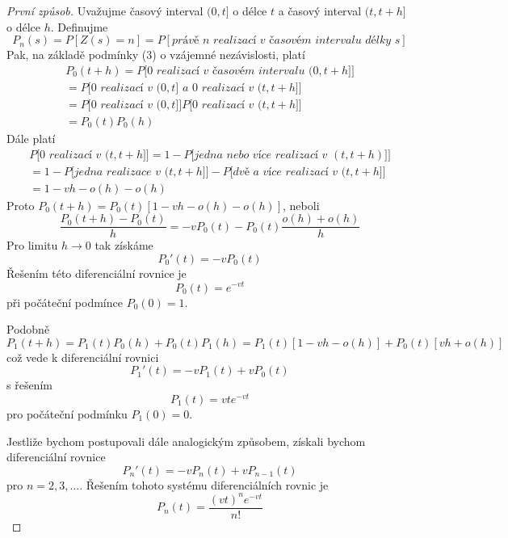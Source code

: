 \begin{proof}[První způsob]
Uvažujme časový interval $(0, t]$ o délce $t$ a časový interval $(t, t + h]$ o délce $h$. Definujme
\begin{equation*}
P_n(s) = P[Z(s) = n] = P[\textit{právě } n \textit{ realizací v časovém intervalu délky } s]
\end{equation*}
Pak, na základě podmínky (3) o vzájemné nezávislosti, platí
\begin{gather*}
P_0(t + h) = P\big[0 \textit{ realizací v časovém intervalu } (0, t + h]\big]\\
= P\big[0 \textit{ realizací v } (0, t] \textit{ a } 0 \textit{ realizací v } (t, t + h] \big]\\
= P\big[0 \textit{ realizací v } (0, t] \big]P \big[0 \textit{ realizací v } (t, t + h] \big]\\
= P_0(t)P_0(h) 
\end{gather*}
Dále platí
\begin{gather*}
P\big[0 \textit{ realizací v } (t, t + h]\big] = 1 - P\big[\textit{jedna nebo více realizací v } (t, t + h)]\big]\\
= 1 - P\big[\textit{jedna realizace v } (t, t + h]\big] - P\big[\textit{dvě a více realizací v } (t, t+h]\big]\\
= 1 - vh - o(h) - o(h)
\end{gather*}
Proto $P_0(t + h) = P_0(t)[1 - vh - o(h) - o(h)]$, neboli
\begin{equation*}
\frac{P_0(t + h) - P_0(t)}{h} = - vP_0(t) - P_0(t) \frac{o(h) + o(h)}{h}
\end{equation*}
Pro limitu $h \rightarrow 0$ tak získáme
\begin{equation*}
P_0'(t) = -v P_0(t)
\end{equation*}
Řešením této diferenciální rovnice je
\begin{equation*}
P_0(t) = e^{-vt}
\end{equation*}
při počáteční podmínce $P_0(0) = 1$.

Podobně
\begin{equation*}
P_1(t+h) = P_1(t)P_0(h) + P_0(t)P_1(h) = P_1(t)[1 - vh - o(h)] + P_0(t)[vh + o(h)]
\end{equation*}
což vede k diferenciální rovnici
\begin{equation*}
P_1'(t) = -vP_1(t) + vP_0(t)
\end{equation*}
s řešením
\begin{equation*}
P_1(t) = vte^{-vt}
\end{equation*}
pro počáteční podmínku $P_1(0) = 0$.

Jestliže bychom postupovali dále analogickým způsobem, získali bychom diferenciální rovnice
\begin{equation*}
P_n'(t) = -v P_n(t) + v P_{n-1}(t)
\end{equation*}
pro $n = 2, 3, ...$. Řešením tohoto systému diferenciálních rovnic je
\begin{equation*}
P_n(t) = \frac{(vt)^n e^{-vt}}{n!}
\end{equation*}
\end{proof}

